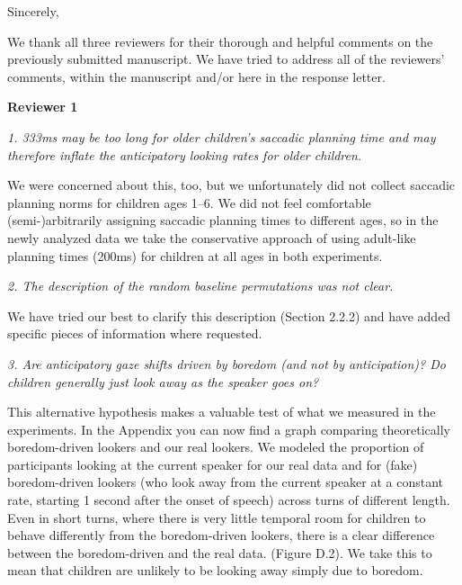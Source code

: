 \documentclass[11pt,a4paper]{letter} %
\begin{document}
\begin{letter}{}
\closing{Sincerely,}

\newpage

\noindent We thank all three reviewers for their thorough and helpful comments on the previously submitted manuscript. We have tried to address all of the reviewers' comments, within the manuscript and/or here in the response letter.

\medskip

\noindent \textbf{Reviewer 1}

\noindent \textit{1. 333ms may be too long for older children's saccadic planning time and may therefore inflate the anticipatory looking rates for older children.}

We were concerned about this, too, but we unfortunately did not collect saccadic planning norms for children ages 1--6. We did not feel comfortable (semi-)arbitrarily assigning saccadic planning times to different ages, so in the newly analyzed data we take the conservative approach of using adult-like planning times (200ms) for children at all ages in both experiments.

\smallskip

\noindent \textit{2. The description of the random baseline permutations was not clear.}

\noindent We have tried our best to clarify this description (Section 2.2.2) and have added specific pieces of information where requested.

\smallskip

\noindent \textit{3. Are anticipatory gaze shifts driven by boredom (and not by anticipation)? Do children generally just look away as the speaker goes on?}

\noindent This alternative hypothesis makes a valuable test of what we measured in the experiments. In the Appendix you can now find a graph comparing theoretically boredom-driven lookers and our real lookers. We modeled the proportion of participants looking at the current speaker for our real data and for (fake) boredom-driven lookers (who look away from the current speaker at a constant rate, starting 1 second after the onset of speech) across turns of different length. Even in short turns, where there is very little temporal room for children to behave differently from the boredom-driven lookers, there is a clear difference between the boredom-driven and the real data. (Figure D.2). We take this to mean that children are unlikely to be looking away simply due to boredom.


\end{letter}
\end{document}
